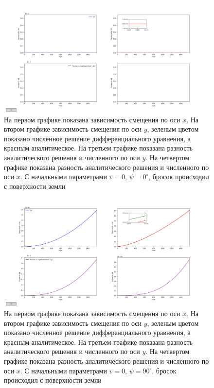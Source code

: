 \documentclass[hoptionsi, twocolumn]{revtex4-2}
\begin{document}
\begin{figure}[H]
\includegraphics[width=1\textwidth]{fig_3.png}
    \caption{На первом графике показана зависимость смещения по оси $x$. На втором графике зависимость смещения по оси $y$, зеленым цветом показано численное решение дифференциального уравнения, а красным аналитическое. На третьем графике показана разность аналитического решения и численного по оси $y$. На четвертом графике показана разность аналитического решения и численного по оси $x$. С начальными параметрами $v=0$, $\psi=0^{\circ}$, бросок происходил с поверхности земли}
\end{figure}
\begin{figure}[H]
\includegraphics[width=1\textwidth]{fig_4.png}
    \caption{На первом графике показана зависимость смещения по оси $x$. На втором графике зависимость смещения по оси $y$, зеленым цветом показано численное решение дифференциального уравнения, а красным аналитическое. На третьем графике показана разность аналитического решения и численного по оси $y$. На четвертом графике показана разность аналитического решения и численного по оси $x$. С начальными параметрами $v=0$, $\psi=90^{\circ}$, бросок происходил с поверхности земли}
\end{figure}
\end{document}

